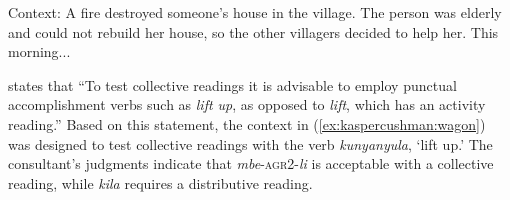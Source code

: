 \documentclass[output=paper,modfonts,nonflat]{langsci/langscibook}
\begin{document}
\begin{exe}

 \ex Context: A fire destroyed someone's house in the village. The person was elderly and could not rebuild her house, so the other villagers decided to help her. This morning... 

\begin{xlist}



\end{xlist}
\end{exe}


\cite[121]{szabolcsi10} states that ``To test collective readings it is advisable to employ punctual accomplishment verbs such as \textit{lift up}, as opposed to \emph{lift}, which has an activity reading.'' Based on this statement, the context in (\ref{ex:kaspercushman:wagon}) was designed to test collective readings with the verb \textit{kunyanyula}, `lift up.' The consultant's judgments indicate that  \textit{mbe}-\textsc{agr2}-\textit{li} is acceptable with a collective reading, while \textit{kila} requires a distributive reading. 
\end{document}
